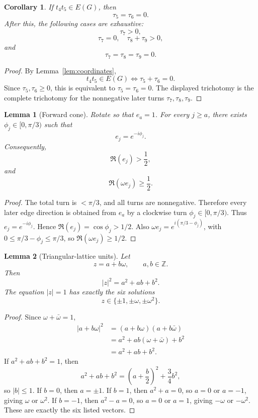 \documentclass[11pt]{article}
\newtheorem{lemma}{Lemma}
\newtheorem{corollary}{Corollary}
\begin{document}
\begin{corollary}\label{cor:t4t5}
If $t_4t_5\in E(G)$, then
\[
  \tau_5=\tau_6=0.
\]
After this, the following cases are exhaustive:
\[
  \tau_7>0,
\]
\[
  \tau_7=0,\quad \tau_8+\tau_9>0,
\]
and
\[
  \tau_7=\tau_8=\tau_9=0.
\]
\end{corollary}

\begin{proof}
By Lemma~\ref{lem:coordinates},
\[
  t_4t_5\in E(G)\iff \tau_5+\tau_6=0.
\]
Since $\tau_5,\tau_6\ge0$, this is equivalent to $\tau_5=\tau_6=0$. The displayed trichotomy is the complete trichotomy for the nonnegative later turns $\tau_7,\tau_8,\tau_9$.
\end{proof}

\begin{lemma}[Forward cone]\label{lem:forward-cone}
Rotate so that $e_a=1$. For every $j\ge a$, there exists $\phi_j\in[0,\pi/3)$ such that
\[
  e_j=e^{-i\phi_j}.
\]
Consequently,
\[
  \Re(e_j)>\frac12,
\]
and
\[
  \Re(\omega e_j)\ge\frac12.
\]
\end{lemma}

\begin{proof}
The total turn is $<\pi/3$, and all turns are nonnegative. Therefore every later edge direction is obtained from $e_a$ by a clockwise turn $\phi_j\in[0,\pi/3)$. Thus $e_j=e^{-i\phi_j}$. Hence $\Re(e_j)=\cos\phi_j>1/2$. Also $\omega e_j=e^{i(\pi/3-\phi_j)}$, with $0\le \pi/3-\phi_j\le \pi/3$, so $\Re(\omega e_j)\ge1/2$.
\end{proof}

\begin{lemma}[Triangular-lattice units]\label{lem:tri-units}
Let
\[
  z=a+b\omega,
  \qquad a,b\in\mathbb Z.
\]
Then
\[
  |z|^2=a^2+ab+b^2.
\]
The equation $|z|=1$ has exactly the six solutions
\[
  z\in\{\pm1,\pm\omega,\pm\omega^2\}.
\]
\end{lemma}

\begin{proof}
Since $\omega+\bar\omega=1$,
\[
\begin{aligned}
  |a+b\omega|^2
  &=(a+b\omega)(a+b\bar\omega)\\
  &=a^2+ab(\omega+\bar\omega)+b^2\\
  &=a^2+ab+b^2.
\end{aligned}
\]
If $a^2+ab+b^2=1$, then
\[
  a^2+ab+b^2=\left(a+\frac b2\right)^2+\frac34b^2,
\]
so $|b|\le1$. If $b=0$, then $a=\pm1$. If $b=1$, then $a^2+a=0$, so $a=0$ or $a=-1$, giving $\omega$ or $\omega^2$. If $b=-1$, then $a^2-a=0$, so $a=0$ or $a=1$, giving $-\omega$ or $-\omega^2$. These are exactly the six listed vectors.
\end{proof}
\end{document}
